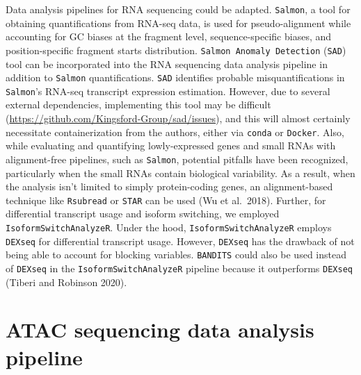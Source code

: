 \documentclass[12pt,twoside]{reedthesis}
\begin{document}
Data analysis pipelines for RNA sequencing could be adapted. \texttt{Salmon}, a tool for obtaining quantifications from RNA-seq data, is used for pseudo-alignment while accounting for GC biases at the fragment level, sequence-specific biases, and position-specific fragment starts distribution. \texttt{Salmon\ Anomaly\ Detection} (\texttt{SAD}) tool can be incorporated into the RNA sequencing data analysis pipeline in addition to \texttt{Salmon} quantifications. \texttt{SAD} identifies probable misquantifications in \texttt{Salmon}'s RNA-seq transcript expression estimation. However, due to several external dependencies, implementing this tool may be difficult (\url{https://github.com/Kingsford-Group/sad/issues}), and this will almost certainly necessitate containerization from the authors, either via \texttt{conda} or \texttt{Docker}. Also, while evaluating and quantifying lowly-expressed genes and small RNAs with alignment-free pipelines, such as \texttt{Salmon}, potential pitfalls have been recognized, particularly when the small RNAs contain biological variability. As a result, when the analysis isn't limited to simply protein-coding genes, an alignment-based technique like \texttt{Rsubread} or \texttt{STAR} can be used (Wu et al.~2018). Further, for differential transcript usage and isoform switching, we employed \texttt{IsoformSwitchAnalyzeR}. Under the hood, \texttt{IsoformSwitchAnalyzeR} employs \texttt{DEXseq} for differential transcript usage. However, \texttt{DEXseq} has the drawback of not being able to account for blocking variables. \texttt{BANDITS} could also be used instead of \texttt{DEXseq} in the \texttt{IsoformSwitchAnalyzeR} pipeline because it outperforms \texttt{DEXseq} (Tiberi and Robinson 2020).

\hypertarget{atac-sequencing-data-analysis-pipeline}{%
\section*{ATAC sequencing data analysis pipeline}\label{atac-sequencing-data-analysis-pipeline}}
\end{document}
